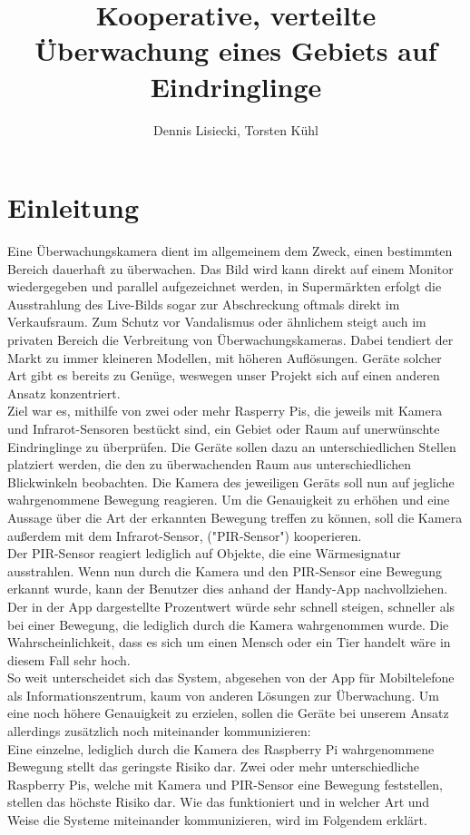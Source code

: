 \documentclass[journal]{IEEEtran}
\title{Kooperative, verteilte Überwachung eines Gebiets auf Eindringlinge}		%
\author{Dennis Lisiecki, Torsten Kühl}								%
\begin{document}

\maketitle	%




\section{Einleitung}
Eine Überwachungskamera dient im allgemeinem dem Zweck, einen bestimmten Bereich dauerhaft zu überwachen. Das Bild wird kann direkt auf einem Monitor wiedergegeben und parallel aufgezeichnet werden, in Supermärkten erfolgt die Ausstrahlung des Live-Bilds sogar zur Abschreckung oftmals direkt im Verkaufsraum. Zum Schutz vor Vandalismus oder ähnlichem steigt auch im privaten Bereich die Verbreitung von Überwachungskameras. Dabei tendiert der Markt zu immer kleineren Modellen, mit höheren Auflösungen. Geräte solcher Art gibt es bereits zu Genüge, weswegen unser Projekt sich auf einen anderen Ansatz konzentriert.\\ Ziel war es, mithilfe von zwei oder mehr Rasperry Pis, die jeweils mit Kamera und Infrarot-Sensoren bestückt sind, ein Gebiet oder Raum auf unerwünschte Eindringlinge zu überprüfen. Die Geräte sollen dazu an unterschiedlichen Stellen platziert werden, die den zu überwachenden Raum aus unterschiedlichen Blickwinkeln beobachten. Die Kamera des jeweiligen Geräts soll nun auf jegliche wahrgenommene Bewegung reagieren. Um die Genauigkeit zu erhöhen und eine Aussage über die Art der erkannten Bewegung treffen zu können, soll die Kamera außerdem mit dem Infrarot-Sensor, ("PIR-Sensor") kooperieren.\\ Der PIR-Sensor reagiert lediglich auf Objekte, die eine Wärmesignatur ausstrahlen. Wenn nun durch die Kamera und den PIR-Sensor eine Bewegung erkannt wurde, kann der Benutzer dies anhand der Handy-App nachvollziehen. Der in der App dargestellte Prozentwert würde sehr schnell steigen, schneller als bei einer Bewegung, die lediglich durch die Kamera wahrgenommen wurde. Die Wahrscheinlichkeit, dass es sich um einen Mensch oder ein Tier handelt wäre in diesem Fall sehr hoch.\\ So weit unterscheidet sich das System, abgesehen von der App für Mobiltelefone als Informationszentrum, kaum von anderen Lösungen zur Überwachung. Um eine noch höhere Genauigkeit zu erzielen, sollen die Geräte bei unserem Ansatz allerdings zusätzlich noch miteinander kommunizieren:\\ Eine einzelne, lediglich durch die Kamera des Raspberry Pi wahrgenommene Bewegung stellt das geringste Risiko dar. Zwei oder mehr unterschiedliche Raspberry Pis, welche mit Kamera und PIR-Sensor eine Bewegung feststellen, stellen das höchste Risiko dar. Wie das funktioniert und in welcher Art und Weise die Systeme miteinander kommunizieren, wird im Folgendem erklärt.
\end{document}
